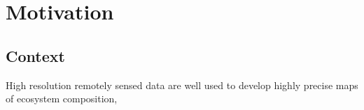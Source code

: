 \chapter{Motivation}\label{cha:motivation}

\section{Context}
High resolution remotely sensed data are well used to develop highly precise maps of ecosystem composition,